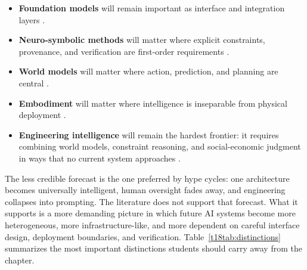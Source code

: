 \documentclass[12pt]{article}
\begin{document}
\begin{itemize}
    \item \textbf{Foundation models} will remain important as interface and integration layers \cite{bommasani2021foundation}.
    \item \textbf{Neuro-symbolic methods} will matter where explicit constraints, provenance, and verification are first-order requirements \cite{besold2017nesy,manhaeve2019deepproblog}.
    \item \textbf{World models} will matter where action, prediction, and planning are central \cite{hafner2019planet,hafner2020dreamer,lecun2022path,assran2025vjepa2}.
    \item \textbf{Embodiment} will matter where intelligence is inseparable from physical deployment \cite{brooks1990elephants,brohan2023rt2,openx2023rtx,kim2025openvla}.
    \item \textbf{Engineering intelligence} will remain the hardest frontier: it requires combining world models, constraint reasoning, and social-economic judgment in ways that no current system approaches \cite{chollet2019measure,brooks1991representation}.
\end{itemize}

The less credible forecast is the one preferred by hype cycles: one architecture becomes universally intelligent, human oversight fades away, and engineering collapses into prompting. The literature does not support that forecast. What it supports is a more demanding picture in which future AI systems become more heterogeneous, more infrastructure-like, and more dependent on careful interface design, deployment boundaries, and verification. Table~\ref{t18tab:distinctions} summarizes the most important distinctions students should carry away from the chapter.
\end{document}
